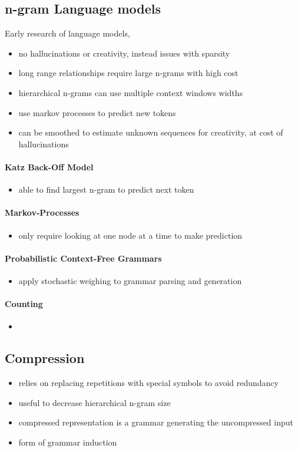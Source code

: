 \subsection{n-gram Language models}
Early research of language models, 
\begin{itemize}
    \item no hallucinations or creativity, instead issues with sparsity
    \item long range relationships require large n-grams with high cost
    \item hierarchical n-grams can use multiple context windows widths
    \item use markov processes to predict new tokens
    \item can be smoothed to estimate unknown sequences for creativity, at cost of hallucinations
\end{itemize}
\paragraph{Katz Back-Off Model}
\begin{itemize}
    \item able to find largest n-gram to predict next token
\end{itemize}
\paragraph{Markov-Processes}
\begin{itemize}
    \item only require looking at one node at a time to make prediction
\end{itemize}
\paragraph{Probabilistic Context-Free Grammars}
\begin{itemize}
    \item apply stochastic weighing to grammar parsing and generation
\end{itemize}
\paragraph{Counting}
\begin{itemize}
    \item 
\end{itemize}
\subsection{Compression}
\begin{itemize}
    \item relies on replacing repetitions with special symbols to avoid redundancy
    \item useful to decrease hierarchical n-gram size
    \item compressed representation is a grammar generating the uncompressed input
    \item form of grammar induction
\end{itemize}
